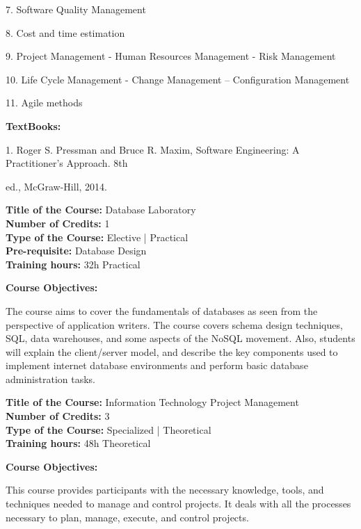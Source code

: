 \documentclass[12pt,a4paper]{article}
\begin{document}
7. Software Quality Management\par
8. Cost and time estimation\par
9. Project Management - Human Resources Management - Risk Management\par
10. Life Cycle Management - Change Management – Configuration Management\par
11. Agile methods\par\vspace{4pt}
\textbf{TextBooks:}\par\vspace{2pt}
1. Roger S. Pressman and Bruce R. Maxim, Software Engineering: A Practitioner’s Approach. 8th\par
ed., McGraw-Hill, 2014.\par
\vspace{4pt}

\newpage
\textbf{Title of the Course:} Database Laboratory\\
\textbf{Number of Credits:} 1\\
\textbf{Type of the Course:} Elective | Practical\\
\textbf{Pre-requisite:} Database Design\\
\textbf{Training hours:} 32h Practical\par\vspace{4pt}
\textbf{Course Objectives:}\par\vspace{2pt}
The course aims to cover the fundamentals of databases as seen from the perspective of application
writers. The course covers schema design techniques, SQL, data warehouses, and some aspects of
the NoSQL movement. Also, students will explain the client/server model, and describe the key
components used to implement internet database environments and perform basic database
administration tasks.\par\vspace{4pt}

\newpage
\textbf{Title of the Course:} Information Technology Project Management\\
\textbf{Number of Credits:} 3\\
\textbf{Type of the Course:} Specialized | Theoretical\\
\textbf{Training hours:} 48h Theoretical\par\vspace{4pt}
\textbf{Course Objectives:}\par\vspace{2pt}
This course provides participants with the necessary knowledge, tools, and techniques needed to
manage and control projects. It deals with all the processes necessary to plan, manage, execute,
and control projects.\par\vspace{4pt}
\end{document}
